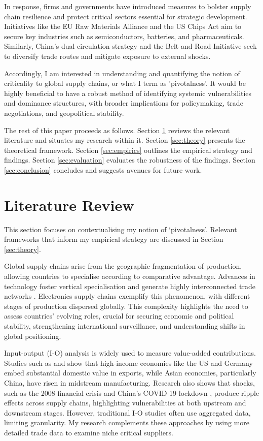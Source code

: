 \documentclass[11pt]{article}
\begin{document}
In response, firms and governments have introduced measures to bolster supply chain resilience and protect critical sectors essential for strategic development. Initiatives like the EU Raw Materials Alliance and the US Chips Act aim to secure key industries such as semiconductors, batteries, and pharmaceuticals. Similarly, China’s dual circulation strategy and the Belt and Road Initiative seek to diversify trade routes and mitigate exposure to external shocks.

Accordingly, I am interested in understanding and quantifying the notion of criticality to global supply chains, or what I term as 'pivotalness'. It would be highly beneficial to have a robust method of identifying systemic vulnerabilities and dominance structures, with broader implications for policymaking, trade negotiations, and geopolitical stability.

The rest of this paper proceeds as follows. Section \ref{sec:litreview} reviews the relevant literature and situates my research within it. Section \ref{sec:theory} presents the theoretical framework. Section \ref{sec:empirics} outlines the empirical strategy and findings. Section \ref{sec:evaluation} evaluates the robustness of the findings. Section \ref{sec:conclusion} concludes and suggests avenues for future work.

\section{Literature Review}
\label{sec:litreview}

This section focuses on contextualising my notion of `pivotalness'. Relevant frameworks that inform my empirical strategy are discussed in Section \ref{sec:theory}.

Global supply chains arise from the geographic fragmentation of production, allowing countries to specialise according to comparative advantage. Advances in technology foster vertical specialisation \citep{hummels1999} and generate highly interconnected trade networks \citep{baldwin2016}. Electronics supply chains exemplify this phenomenon, with different stages of production dispersed globally. This complexity highlights the need to assess countries’ evolving roles, crucial for securing economic and political stability, strengthening international surveillance, and understanding shifts in global positioning.

Input-output (I-O) analysis is widely used to measure value-added contributions. Studies such as \citet{koopman2014} and \citet{timmer2014} show that high-income economies like the US and Germany embed substantial domestic value in exports, while Asian economies, particularly China, have risen in midstream manufacturing. Research also shows that shocks, such as the 2008 financial crisis \citep{baldwin2009} and China's COVID-19 lockdown \citep{lafrogne2022}, produce ripple effects across supply chains, highlighting vulnerabilities at both upstream and downstream stages. However, traditional I-O studies often use aggregated data, limiting granularity. My research complements these approaches by using more detailed trade data to examine niche critical suppliers.
\end{document}
